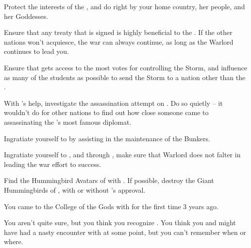 \documentclass[char]{GL2020}
\begin{document}
\begin{itemz}
	\item Protect the interests of the \pShip{}, and do right by your home country, her people, and her Goddesses.
\item Ensure that any treaty that is signed is highly beneficial to the \pShippies{}. If the other nations won't acquiesce, the war can always continue, as long as the Warlord continues to lead you.
	\item Ensure that \cPresident{} gets access to the most votes for controlling the Storm, and influence as many of the students as possible to send the Storm to a nation other than the \pShip{}.
	\item With \cPresident{}'s help, investigate the assassination attempt on \cHeadDiplomat{}. Do so quietly -- it wouldn't do for other nations to find out how close someone came to assassinating the \pShip{}'s most famous diplomat.
	\item Ingratiate yourself to \cBunker{} by assisting \cBunker{\them} in the maintenance of the Bunkers.
	\item Ingratiate yourself to \cWarlordDaughter{}, and through \cWarlordDaughter{\them}, make sure that Warlord \cLoud{} does not falter in leading the \pShip{} war effort to success.
	\item Find the Hummingbird Avatars of \cFarmGod{} with \cDisney{}. If possible, destroy the Giant Hummingbirds of \cFarmGod{}, with or without \cDisney{}'s approval.
\end{itemz}

\begin{itemz}[Notes]
	\item You came to the College of the Gods with \cHeadDiplomat{} for the first time 3 years ago.
	\item You aren't quite sure, but you think you recognize \cEvil{\full}. You think you and \cHeadDiplomat{} might have had a nasty encounter with \cEvil{\them} at some point, but you can't remember when or where.
\end{itemz}
\end{document}
